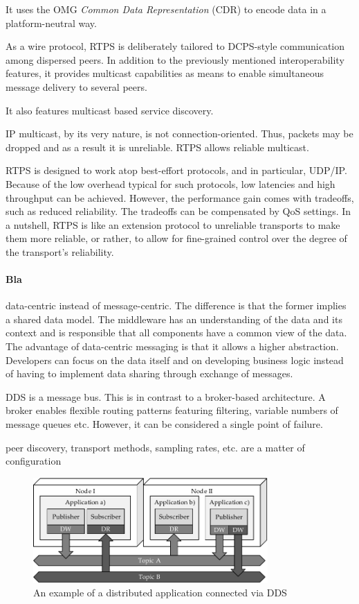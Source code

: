 It uses the OMG \emph{Common Data Representation} (CDR) to encode data in a platform-neutral way. 

As a wire protocol, RTPS is deliberately tailored to DCPS-style communication among dispersed peers. In addition to the previously mentioned interoperability features, it provides multicast capabilities as means to enable simultaneous message delivery to several peers.

It also features multicast based service discovery.

IP multicast, by its very nature, is not connection-oriented. Thus, packets may be dropped and as a result it is unreliable. RTPS allows reliable multicast.

RTPS is designed to work atop best-effort protocols, and in particular, UDP/IP. Because of the low overhead typical for such protocols, low latencies and high throughput can be achieved. However, the performance gain comes with tradeoffs, such as reduced reliability. The tradeoffs can be compensated by QoS settings. In a nutshell, RTPS is like an extension protocol to unreliable transports to make them more reliable, or rather, to allow for fine-grained control over the degree of the transport's reliability.



\paragraph{Bla}

data-centric instead of message-centric. The difference is that the former implies a shared data model. The middleware has an understanding of the data and its context and is responsible that all components have a common view of the data.
The advantage of data-centric messaging is that it allows a higher abstraction. Developers can focus on the data itself and on developing business logic instead of having to implement data sharing through exchange of messages.

DDS is a message bus. This is in contrast to a broker-based architecture. A broker enables flexible routing patterns featuring filtering, variable numbers of message queues etc. However, it can be considered a single point of failure.

peer discovery, transport methods, sampling rates, etc. are a matter of configuration


\begin{figure}[htpb]
  \centering
  \includegraphics[width=0.8\textwidth]{figures/dds.pdf}
  \caption[An example of a distributed application connected via DDS]{An example of a distributed application connected via DDS}\label{fig:dds}
\end{figure}

